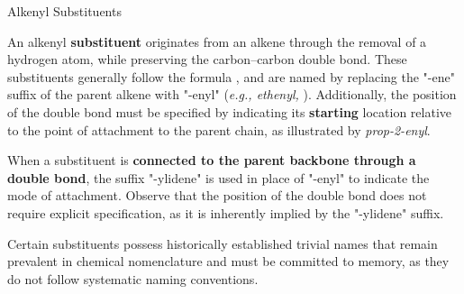\documentclass[10pt]{article}
\begin{document}
      \begin{core}{Alkenyl Substituents}

        An alkenyl \textbf{substituent} originates from an alkene through the removal of a hydrogen atom, while preserving the carbon--carbon double bond. These substituents generally follow the formula , and are named by replacing the "-ene" suffix of the parent alkene with "-enyl" (\textit{e.g., ethenyl, }). Additionally, the position of the double bond must be specified by indicating its \textbf{starting} location relative to the point of attachment to the parent chain, as illustrated by \textit{prop-2-enyl}.


        When a substituent is \textbf{connected to the parent backbone through a double bond}, the suffix "-ylidene" is used in place of "-enyl" to indicate the mode of attachment. Observe that the position of the double bond does not require explicit specification, as it is inherently implied by the "-ylidene" suffix.


        Certain substituents possess historically established trivial names that remain prevalent in chemical nomenclature and must be committed to memory, as they do not follow systematic naming conventions.

        \vspace{-1.2cm}

      \end{core}
\end{document}

